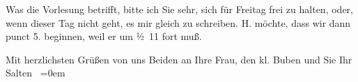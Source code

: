 \begin{ledgroupsized}[t]{13cm}
            \pend
           \pstart
           {\pb}Was die Vorlesung betrifft, bitte ich Sie sehr,
      sich für Freitag frei zu halten, oder,
      wenn dieser Tag nicht geht, es mir
      gleich zu schreiben. H. möchte, dass wir
      dann punct 5. beginnen, weil
      er um ½ 11 fort muß.
      
            \pend
           \pstart
           Mit herzlichsten Grüßen von uns
      Beiden an Ihre Frau, den kl.
               Buben und Sie\pend
           \pstart
           Ihr 
               {\\[\baselineskip]}\spacefill\mbox{Salten
                  }\pend
           \leftskip=0em{}
         
         \endnumbering{}\end{ledgroupsized}\begin{anhang}\end{anhang}\newcommand{\dateiname}{L03347}\newcommand{\titel}{Felix Salten an Arthur Schnitzler, [12. 10. 1903]}\newcommand{\editorInnen}{Martin Anton Müller und Laura Untner}
      